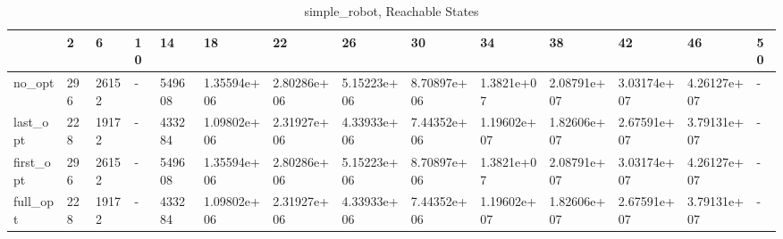 \begin{table}
\caption{simple_robot, Reachable States}
\label{simple_robot_reach}
\begin{tabular}{llllllllllllll}
\toprule
 & 2 & 6 & 10 & 14 & 18 & 22 & 26 & 30 & 34 & 38 & 42 & 46 & 50 \\
\midrule
no_opt & 296 & 26152 & - & 549608 & 1.35594e+06 & 2.80286e+06 & 5.15223e+06 & 8.70897e+06 & 1.3821e+07 & 2.08791e+07 & 3.03174e+07 & 4.26127e+07 & - \\
last_opt & 228 & 19172 & - & 433284 & 1.09802e+06 & 2.31927e+06 & 4.33933e+06 & 7.44352e+06 & 1.19602e+07 & 1.82606e+07 & 2.67591e+07 & 3.79131e+07 & - \\
first_opt & 296 & 26152 & - & 549608 & 1.35594e+06 & 2.80286e+06 & 5.15223e+06 & 8.70897e+06 & 1.3821e+07 & 2.08791e+07 & 3.03174e+07 & 4.26127e+07 & - \\
full_opt & 228 & 19172 & - & 433284 & 1.09802e+06 & 2.31927e+06 & 4.33933e+06 & 7.44352e+06 & 1.19602e+07 & 1.82606e+07 & 2.67591e+07 & 3.79131e+07 & - \\
\bottomrule
\end{tabular}
\end{table}
